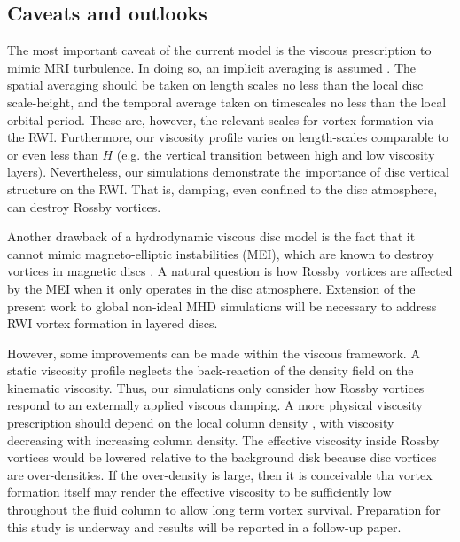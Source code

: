 \subsection{Caveats and outlooks}\label{caveats}

The most important caveat of the current model is the viscous
prescription to mimic MRI turbulence. In doing so, an implicit
averaging is assumed \citep{balbus99}. The spatial averaging should be
taken on length scales no less than the local disc scale-height, and
the temporal average taken on timescales no less than the local
orbital period. These are, however, the relevant scales for vortex
formation via the RWI. Furthermore, our viscosity profile varies on
length-scales comparable to or even less than $H$ (e.g. the vertical transition
between high and low viscosity layers). Nevertheless, our simulations demonstrate %
the importance of disc vertical structure on the RWI. That is,
damping, even confined to the disc atmosphere, can destroy Rossby
vortices.   

Another drawback of a hydrodynamic viscous disc model is the
fact that it cannot mimic magneto-elliptic instabilities (MEI), which
are known to destroy vortices in magnetic discs
\citep{lyra11,mizerski12}. A natural question is how 
Rossby vortices are affected by the MEI when it only operates in
the disc atmosphere. Extension of the present work to global non-ideal
MHD simulations will be necessary to address RWI vortex formation in
layered discs.   

However, some improvements can be made within the viscous
framework. A static viscosity profile neglects the
back-reaction of the density field on the kinematic viscosity. Thus,
our simulations only consider how Rossby vortices 
respond to an externally applied viscous damping. A more
physical viscosity prescription should depend on the local column density
\citep{fleming03}, with viscosity decreasing with increasing column
density. The effective viscosity inside Rossby vortices would be
lowered relative to the background disk because disc vortices are
over-densities. If the over-density is large, then it is
conceivable tha vortex formation itself may render the effective
viscosity to be sufficiently low throughout the fluid column to allow
long term vortex survival.    
Preparation for this study is underway and results will be reported in
a follow-up paper. 
